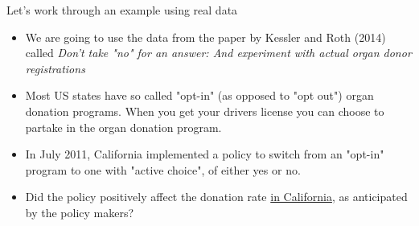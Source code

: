 \documentclass[notes,11pt, aspectratio=169]{beamer}
\begin{document}
\begin{frame}{Let's work through an example using real data}
\begin{itemize}
    \item We are going to use the data from the paper by Kessler and Roth (2014) called \emph{Don't take "no" for an answer: And experiment with actual organ donor registrations} 
    \item Most US states have so called "opt-in" (as opposed to "opt out") organ donation programs. When you get your drivers license you can choose to partake in the organ donation program.
    \item In July 2011, California implemented a policy to switch from an "opt-in" program to one with "active choice", of either yes or no. 
    \item Did the policy positively affect the donation rate \underline{in California}, as anticipated by the policy makers? 
\end{itemize}
\end{frame}
\end{document}
